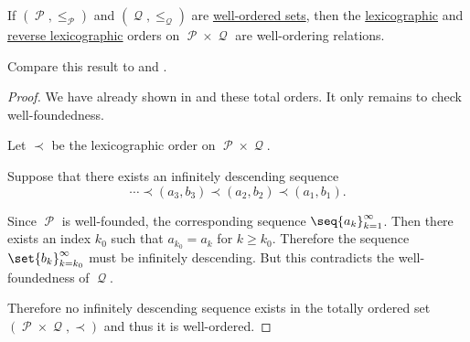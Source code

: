 \begin{proposition}\label{thm:well_ordered_lexicographic_order_is_well_ordered}
  If \( (\mscrP, \leq_\mscrP) \) and \( (\mscrQ, \leq_\mscrQ) \) are \hyperref[def:well_ordered_set]{well-ordered sets}, then the \hyperref[eq:def:lexicographic_order]{lexicographic} and \hyperref[eq:def:lexicographic_order/reverse]{reverse lexicographic} orders on \( \mscrP \times \mscrQ \) are well-ordering relations.

  Compare this result to  and .
\end{proposition}
\begin{proof}
  We have already shown in  and these total orders. It only remains to check well-foundedness.

   Let \( \prec \) be the lexicographic order on \( \mscrP \times \mscrQ \).

  Suppose that there exists an infinitely descending sequence
  \begin{equation*}
    \cdots \prec (a_3, b_3) \prec (a_2, b_2) \prec (a_1, b_1).
  \end{equation*}

  Since \( \mscrP \) is well-founded, the corresponding sequence \( \seq{ a_k }_{k=1}^\infty \). Then there exists an index \( k_0 \) such that \( a_{k_0} = a_k \) for \( k \geq k_0 \). Therefore the sequence \( \set{ b_k }_{k=k_0}^\infty \) must be infinitely descending. But this contradicts the well-foundedness of \( \mscrQ \).

  Therefore no infinitely descending sequence exists in the totally ordered set \( (\mscrP \times \mscrQ, \prec) \) and thus it is well-ordered.
\end{proof}
